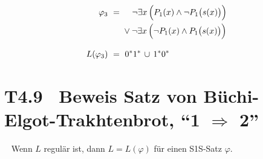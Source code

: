 \documentclass[fontsize=11pt, twoside=false, numbers=autoenddot]{scrbook}
\begin{document}
\par\medskip\noindent
{}
%
\begin{align*}
  \varphi_3    & ~=~ \hspace*{3mm}      \lnot \exists x\,\Big( P_1(x) \land \lnot P_1\big(s(x)\big) \Big) \\
               &     \hspace*{6mm} \lor \lnot \exists x\,\Big( \lnot P_1(x) \land P_1\big(s(x)\big) \Big) \\[3mm]
  L(\varphi_3) & ~=~ 0^*1^* \,\cup\, 1^*0^*
\end{align*}

\section*{T4.9~ Beweis Satz von Büchi-Elgot-Trakhtenbrot, {\boldmath "`1 $\Rightarrow$ 2"'}}

~ Wenn $L$ regulär ist, dann $L=L(\varphi)$ für einen S1S-Satz $\varphi$.
\end{document}
